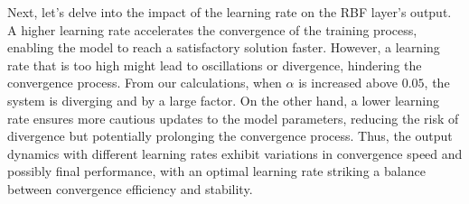 Next, let's delve into the impact of the learning rate on the RBF layer's output. A higher learning rate accelerates the convergence of the training process, enabling the model to reach a satisfactory solution faster.
However, a learning rate that is too high might lead to oscillations or divergence, hindering the convergence process.
From our calculations, when $\alpha$ is increased above $0.05$, the system is diverging and by a large factor. 
On the other hand, a lower learning rate ensures more cautious updates to the model parameters, reducing the risk of divergence but potentially prolonging the convergence process.
Thus, the output dynamics with different learning rates exhibit variations in convergence speed and possibly final performance, with an optimal learning rate striking a balance between convergence efficiency and stability.
\vspace{3mm}